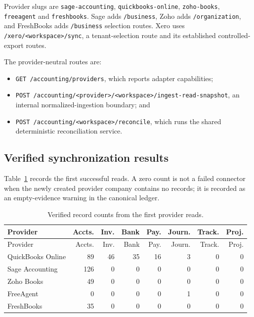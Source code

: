 Provider slugs are \texttt{sage-accounting},
\texttt{quickbooks-online}, \texttt{zoho-books}, \texttt{freeagent} and
\texttt{freshbooks}.  Sage adds \texttt{/business}, Zoho adds
\texttt{/organization}, and FreshBooks adds \texttt{/business} selection
routes.  Xero uses \texttt{/xero/<workspace>/sync}, a tenant-selection route and
its established controlled-export routes.

The provider-neutral routes are:

\begin{itemize}[leftmargin=*]
  \item \texttt{GET /accounting/providers}, which reports adapter capabilities;
  \item \texttt{POST /accounting/<provider>/<workspace>/ingest-read-snapshot},
        an internal normalized-ingestion boundary; and
  \item \texttt{POST /accounting/<workspace>/reconcile}, which runs the shared
        deterministic reconciliation service.
\end{itemize}

\subsection{Verified synchronization results}

Table~\ref{tab:accounting-sync-results} records the first successful reads.  A
zero count is not a failed connector when the newly created provider company
contains no records; it is recorded as an empty-evidence warning in the
canonical ledger.

\begin{longtable}{@{}p{}rrrrrrr@{}}
\caption{Verified record counts from the first provider reads.}
\label{tab:accounting-sync-results}\\
\toprule
Provider & Accts. & Inv. & Bank & Pay. & Journ. & Track. & Proj. \\
\midrule
\endfirsthead
\toprule
Provider & Accts. & Inv. & Bank & Pay. & Journ. & Track. & Proj. \\
\midrule
\endhead
QuickBooks Online & 89 & 46 & 35 & 16 & 3 & 0 & 0 \\
Sage Accounting & 126 & 0 & 0 & 0 & 0 & 0 & 0 \\
Zoho Books & 49 & 0 & 0 & 0 & 0 & 0 & 0 \\
FreeAgent & 0 & 0 & 0 & 0 & 1 & 0 & 0 \\
FreshBooks & 35 & 0 & 0 & 0 & 0 & 0 & 0 \\
\bottomrule
\end{longtable}

